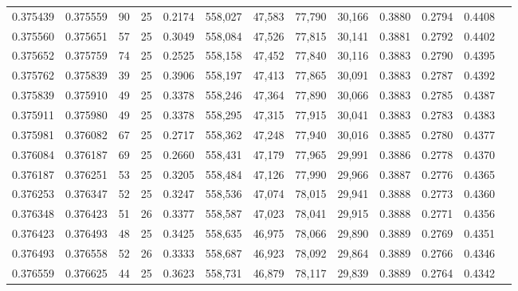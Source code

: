 \begin{tabular}{rrrrrrrrrrrrr}
0.375439 & 0.375559 &    90 &  25 &                                     0.2174 & 558,027 &  47,583 &  77,790 &  30,166 & 0.3880 & 0.2794 & 0.4408 \\
0.375560 & 0.375651 &    57 &  25 &                                     0.3049 & 558,084 &  47,526 &  77,815 &  30,141 & 0.3881 & 0.2792 & 0.4402 \\
0.375652 & 0.375759 &    74 &  25 &                                     0.2525 & 558,158 &  47,452 &  77,840 &  30,116 & 0.3883 & 0.2790 & 0.4395 \\
0.375762 & 0.375839 &    39 &  25 &                                     0.3906 & 558,197 &  47,413 &  77,865 &  30,091 & 0.3883 & 0.2787 & 0.4392 \\
0.375839 & 0.375910 &    49 &  25 &                                     0.3378 & 558,246 &  47,364 &  77,890 &  30,066 & 0.3883 & 0.2785 & 0.4387 \\
0.375911 & 0.375980 &    49 &  25 &                                     0.3378 & 558,295 &  47,315 &  77,915 &  30,041 & 0.3883 & 0.2783 & 0.4383 \\
0.375981 & 0.376082 &    67 &  25 &                                     0.2717 & 558,362 &  47,248 &  77,940 &  30,016 & 0.3885 & 0.2780 & 0.4377 \\
0.376084 & 0.376187 &    69 &  25 &                                     0.2660 & 558,431 &  47,179 &  77,965 &  29,991 & 0.3886 & 0.2778 & 0.4370 \\
0.376187 & 0.376251 &    53 &  25 &                                     0.3205 & 558,484 &  47,126 &  77,990 &  29,966 & 0.3887 & 0.2776 & 0.4365 \\
0.376253 & 0.376347 &    52 &  25 &                                     0.3247 & 558,536 &  47,074 &  78,015 &  29,941 & 0.3888 & 0.2773 & 0.4360 \\
0.376348 & 0.376423 &    51 &  26 &                                     0.3377 & 558,587 &  47,023 &  78,041 &  29,915 & 0.3888 & 0.2771 & 0.4356 \\
0.376423 & 0.376493 &    48 &  25 &                                     0.3425 & 558,635 &  46,975 &  78,066 &  29,890 & 0.3889 & 0.2769 & 0.4351 \\
0.376493 & 0.376558 &    52 &  26 &                                     0.3333 & 558,687 &  46,923 &  78,092 &  29,864 & 0.3889 & 0.2766 & 0.4346 \\
0.376559 & 0.376625 &    44 &  25 &                                     0.3623 & 558,731 &  46,879 &  78,117 &  29,839 & 0.3889 & 0.2764 & 0.4342 \\

\end{tabular}
